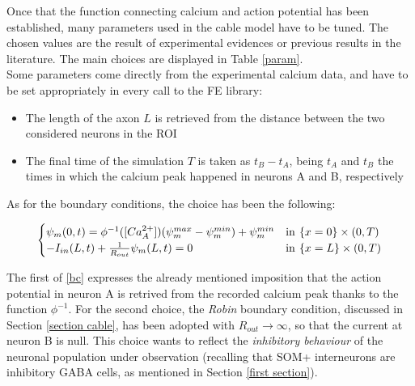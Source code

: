 \documentclass[12pt, a4paper]{report}
\begin{document}
Once that the function connecting calcium and action potential has been established, many parameters used in the cable model have to be tuned. The chosen values are the result of experimental evidences or previous results in the literature. The main choices are displayed in Table \ref{param}.\\
Some parameters come directly from the experimental calcium data, and have to be set appropriately in every call to the FE library:

\begin{itemize}
	\item The length of the axon $L$ is retrieved from the distance between the two considered neurons in the ROI
	
	\item The final time of the simulation $T$ is taken as $t_B - t_A$, being $t_A$ and $t_B$ the times in which the calcium peak happened in neurons A and B, respectively
	
\end{itemize}




As for the boundary conditions, the choice has been the following:

\begin{equation}
	\begin{cases}
	\psi_m(0,t) = \phi^{-1}([Ca_A^{2+}])(\psi_m^{max} - \psi_m^{min}) + \psi_m^{min} & \text{in} \hspace{0.07 cm} \left\{ x = 0\right\} \times (0,T) \\
	-I_{in}(L,t) +\frac{1}{R_{out}}\psi_m(L,t) =0 & \text{in} \hspace{0.07 cm} \left\{ x = L\right\} \times (0,T)
	\end{cases} \label{bc}
\end{equation}

The first of \ref{bc} expresses the already mentioned imposition that the action potential in neuron A is retrived from the recorded calcium peak thanks to the function $\phi^{-1}$. For the second choice, the \textit{Robin} boundary condition, discussed in Section \ref{section cable}, has been adopted with $R_{out} \rightarrow \infty$, so that the current at neuron B is null. This choice wants to reflect the \textit{inhibitory behaviour} of the neuronal population under observation (recalling that SOM+ interneurons are inhibitory GABA cells, as mentioned in Section \ref{first section}).
\end{document}
